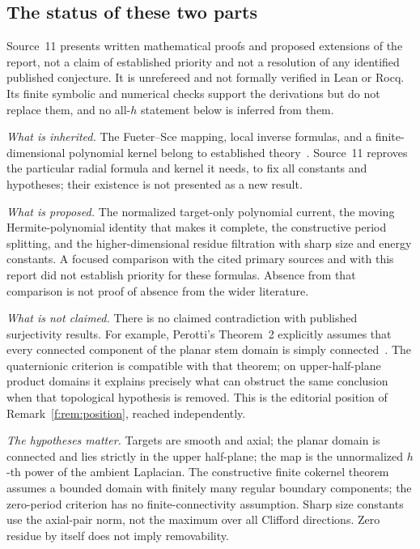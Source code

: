\documentclass[11pt,a4paper]{article}
\numberwithin{equation}{section}
\theoremstyle{definition}
\theoremstyle{remark}
\theoremstyle{plain}
\begin{document}
\subsection{The status of these two parts}
\label{g:sub:status}

Source~11 presents written mathematical proofs and proposed extensions of the
report, not a claim of established priority and not a resolution of any
identified published conjecture. It is unrefereed and not formally verified
in Lean or Rocq. Its finite symbolic and numerical checks support the
derivations but do not replace them, and no all-$h$ statement below is
inferred from them.

\emph{What is inherited.} The Fueter--Sce mapping, local inverse formulas,
and a finite-dimensional polynomial kernel belong to established
theory~\cite{CPSS,CSS13,DDG}. Source~11 reproves the particular radial formula
and kernel it needs, to fix all constants and hypotheses; their existence is
not presented as a new result.

\emph{What is proposed.} The normalized target-only polynomial current, the
moving Hermite-polynomial identity that makes it complete, the constructive
period splitting, and the higher-dimensional residue filtration with sharp
size and energy constants. A focused comparison with the cited primary
sources and with this report did not establish priority for these formulas.
Absence from that comparison is not proof of absence from the wider
literature.

\emph{What is not claimed.} There is no claimed contradiction with published
surjectivity results. For example, Perotti's Theorem~2 explicitly assumes
that every connected component of the planar stem domain is simply
connected~\cite{Perottib}. The quaternionic criterion is compatible with that
theorem; on upper-half-plane product domains it explains precisely what can
obstruct the same conclusion when that topological hypothesis is removed.
This is the editorial position of Remark~\ref{f:rem:position}, reached
independently.

\emph{The hypotheses matter.} Targets are smooth and axial; the planar domain
is connected and lies strictly in the upper half-plane; the map is the
unnormalized $h$-th power of the ambient Laplacian. The constructive finite
cokernel theorem assumes a bounded domain with finitely many regular boundary
components; the zero-period criterion has no finite-connectivity assumption.
Sharp size constants use the axial-pair norm, not the maximum over all
Clifford directions. Zero residue by itself does not imply removability.
\end{document}
